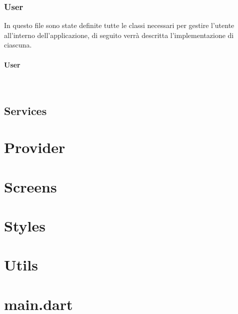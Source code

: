 \subsubsection*{User}
\label{subsubsec:user}

In questo file sono state definite tutte le classi necessari per gestire l'utente all'interno dell'applicazione, di seguito verrà descritta l'implementazione di ciascuna.

\paragraph*{User} ~ \\
\label{par:user}



\subsection{Services}
\label{subsec:services}

\section{Provider}
\label{sec:provider}

\section{Screens}
\label{sec:screens}

\section{Styles}
\label{sec:styles}


\section{Utils}
\label{sec:utils}

\section{main.dart}
\label{sec:main}


